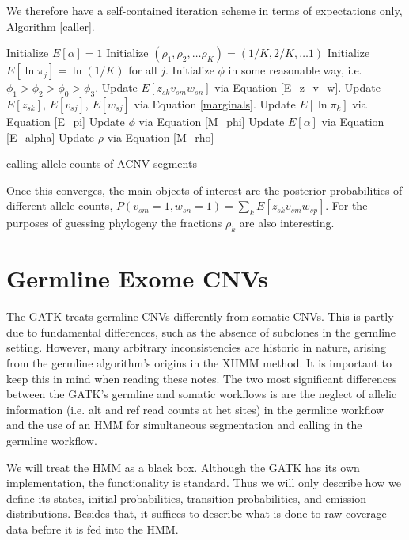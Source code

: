 \documentclass[nofootinbib,amssymb,amsmath]{revtex4}
\begin{document}
We therefore have a self-contained iteration scheme in terms of expectations only, Algorithm \ref{caller}.

 \begin{algorithm}
\begin{algorithmic}[1]
\State Initialize $E[\alpha] = 1$
\State Initialize $(\rho_1, \rho_2, \ldots \rho_K) = (1/K, 2/K, \ldots 1)$
\State Initialize $E[\ln \pi_j] = \ln (1/K)$ for all $j$.
\State Initialize $\phi$ in some reasonable way, i.e. $\phi_1 > \phi_2 > \phi_0 > \phi_3$.
\Repeat
	\State Update $E [z_{sk} v_{sm} w_{sn}]$ via Equation \ref{E_z_v_w}.
	\State Update $E \left[ z_{sk} \right]$, $E[v_{sj}]$, $E[w_{sj}]$ via Equation \ref{marginals}. 
	\State Update $E [ \ln \pi_k ] $ via Equation \ref{E_pi}
	\State Update $\phi$ via Equation \ref{M_phi}
	\State Update $E [ \alpha ] $ via Equation \ref{E_alpha}
	\State Update $\rho$ via Equation \ref{M_rho}
\end{algorithmic}
\caption{calling allele counts of ACNV segments}
\label{caller}
\end{algorithm}

  Once this converges, the main objects of interest are the posterior probabilities of different allele counts, $P(v_{sm} = 1, w_{sn} = 1) = \sum_k E \left[ z_{sk} v_{sm} w_{sp} \right]$.  For the purposes of guessing phylogeny the fractions $\rho_k$ are also interesting.

\section{Germline Exome CNVs} \label{germline}
The GATK treats germline CNVs differently from somatic CNVs.  This is partly due to fundamental differences, such as the absence of subclones in the germline setting.  However, many arbitrary inconsistencies are historic in nature, arising from the germline algorithm's origins in the XHMM method.  It is important to keep this in mind when reading these notes.  The two most significant differences between the GATK's germline and somatic workflows is are the neglect of allelic information (i.e. alt and ref read counts at het sites) in the germline workflow and the use of an HMM for simultaneous segmentation and calling in the germline workflow.  

We will treat the HMM as a black box.  Although the GATK has its own implementation, the functionality is standard.  Thus we will only describe how we define its states, initial probabilities, transition probabilities, and emission distributions.  Besides that, it suffices to describe what is done to raw coverage data before it is fed into the HMM.
\end{document}
